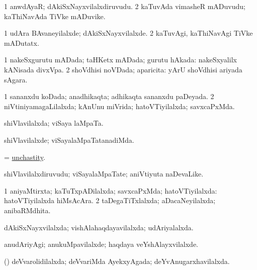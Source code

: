 \bentry
{} 
\gl{\nA}
\expl{}
\bmng
\bnum
\num{1} anwdAyaR; dAkiSxNayxvilalxdiruvudu. 
\num{2} kaTuvAda vimasheR mADuvudu; kaThiNavAda TiVke mADuvike. 
\enum
\emng
\eentry

\bentry
{} 
\gl{\kirxvi}
\expl{}
\bmng
\bnum
\num{1} udAra BAvaneyilalxde; dAkiSxNayxvilalxde. 
\num{2} kaTuvAgi, kaThiNavAgi TiVke mADutatx. 
\enum
\emng
\eentry

\bentry
{} 
\gl{\gu}
\expl{}
\bmng
\bnum
\num{1} nakeSxgurutu mADada; taHKetx mADada; gurutu hAkada:  nakeSxyalilx kANisada divxVpa. 
\num{2} shoVdhisi noVDada; aparicita:  yArU shoVdhisi ariyada sAgara. 
\enum
\emng
\eentry

\bentry
{} 
\gl{\gu}
\expl{}
\bmng
\bnum
\num{1} sananxdu koDada; anadhikaqta; adhikaqta sananxdu paDeyada. 
\num{2} niVtiniyamagaLilalxda; kAnUnu miVrida; hatoVTiyilalxda; savxcaPxMda. 
\enum
\emng
\eentry

\bentry
{} 
\gl{\gu}
\expl{}
\bmng
shiVlavilalxda; viSaya laMpaTa. 
\emng
\eentry

\bentry
{} 
\gl{\kirxvi}
\expl{}
\bmng
shiVlavilalxde; viSayalaMpaTatanadiMda. 
\emng
\eentry

\bentry
{} 
\gl{\nA}
\expl{}
\bmng
= \hyperlink{unchastity}{unchastity}. 
\emng
\eentry

\bentry
{} 
\gl{\nA}
\expl{}
\bmng
shiVlavilalxdiruvudu; viSayalaMpaTate; aniVtiyuta naDevaLike. 
\emng
\eentry

\bentry
{} 
\gl{\gu}
\expl{}
\bmng
\bnum
\num{1} aniyaMtirxta; kaTuTxpADilalxda; savxcaPxMda; hatoVTiyilalxda:  hatoVTiyilalxda hiMsAcAra. 
\num{2} taDegaTiTxlalxda; aDacaNeyilalxda; anibaRMdhita. 
\enum
\emng
\eentry

\bentry
{} 
\gl{\gu}
\expl{}
\bmng
dAkiSxNayxvilalxda; vishAlahaqdayavilalxda; udAriyalalxda. 
\emng
\eentry

\bentry
{} 
\gl{\kirxvi}
\expl{}
\bmng
anudAriyAgi; anukuMpavilalxde; haqdaya veYshAlayxvilalxde. 
\emng
\eentry

\bentry
{} 
\gl{\gu}
\expl{}
\bmng
(\deVva) deVvarolidilalxda; deVvariMda AyekxyAgada; deYvAnugarxhavilalxda. 
\emng
\eentry

